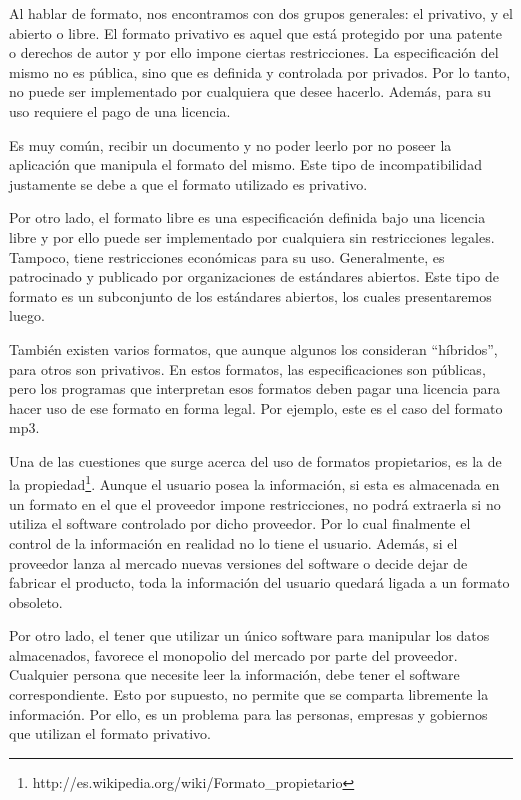\documentclass[12pt]{article}
\begin{document}
Al hablar de formato, nos encontramos con dos grupos generales: el privativo, y el abierto o libre. El formato privativo es aquel que está protegido por una patente o derechos de autor y por ello impone ciertas restricciones. La especificación del mismo no es pública, sino que es definida y controlada por privados. Por lo tanto, no puede ser implementado por cualquiera que desee hacerlo. Además, para su uso requiere el pago de una licencia.

Es muy común, recibir un documento y no poder leerlo por no poseer la aplicación que manipula el formato del mismo. Este tipo de incompatibilidad justamente se debe a que el formato utilizado es privativo. 

Por otro lado, el formato libre es una especificación definida bajo una licencia libre y por ello puede ser implementado por cualquiera sin restricciones legales. Tampoco, tiene restricciones económicas para su uso. Generalmente, es patrocinado y publicado por organizaciones de estándares abiertos. Este tipo de formato es un subconjunto de los estándares abiertos, los cuales presentaremos luego.

También existen varios formatos, que aunque algunos los consideran ``híbridos'', para otros son privativos. En estos formatos, las especificaciones son públicas, pero los programas que interpretan esos formatos deben pagar una licencia para hacer uso de ese formato en forma legal. Por ejemplo, este es el caso del formato mp3.

Una de las cuestiones que surge acerca del uso de formatos propietarios, es la de la propiedad\footnote{http://es.wikipedia.org/wiki/Formato\_propietario}. Aunque el usuario posea la información, si esta es almacenada en un formato en el que el proveedor impone restricciones, no podrá extraerla si no utiliza el software controlado por dicho proveedor. Por lo cual finalmente el control de la información en realidad no lo tiene el usuario. Además, si el proveedor lanza al mercado nuevas versiones del software o decide dejar de fabricar el producto, toda la información del usuario quedará ligada a un formato obsoleto.  

Por otro lado, el tener que utilizar un único software para manipular los datos almacenados, favorece el monopolio del mercado por parte del proveedor. Cualquier persona que necesite leer la información, debe tener el software correspondiente. Esto por supuesto, no permite que se comparta libremente la información. Por ello, es un problema para las personas, empresas y gobiernos que utilizan el formato privativo.
\end{document}
